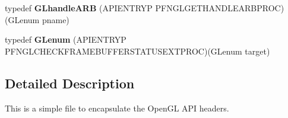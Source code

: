\begin{DoxyCompactItemize}
\item 
typedef {\bfseries G\+Lhandle\+A\+R\+B} (A\+P\+I\+E\+N\+T\+R\+Y\+P P\+F\+N\+G\+L\+G\+E\+T\+H\+A\+N\+D\+L\+E\+A\+R\+B\+P\+R\+O\+C)(G\+Lenum pname)\label{_s_d_l__opengl_8h_aead20ecfc472bd58ebf1f5af54794236}

\item 
typedef {\bfseries G\+Lenum} (A\+P\+I\+E\+N\+T\+R\+Y\+P P\+F\+N\+G\+L\+C\+H\+E\+C\+K\+F\+R\+A\+M\+E\+B\+U\+F\+F\+E\+R\+S\+T\+A\+T\+U\+S\+E\+X\+T\+P\+R\+O\+C)(G\+Lenum target)\label{_s_d_l__opengl_8h_aa4474e19e1c4fc8bbadf5f4fa95736ce}

\end{DoxyCompactItemize}


\subsection{Detailed Description}
This is a simple file to encapsulate the Open\+G\+L A\+P\+I headers. 

